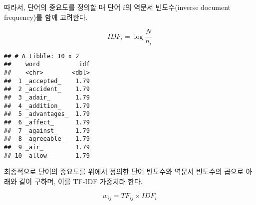 \documentclass[]{book}
\newenvironment{Shaded}{\begin{snugshade}}{\end{snugshade}}
\newcommand{\DataTypeTok}[1]{\textcolor[rgb]{0.13,0.29,0.53}{#1}}
\newcommand{\DecValTok}[1]{\textcolor[rgb]{0.00,0.00,0.81}{#1}}
\newcommand{\KeywordTok}[1]{\textcolor[rgb]{0.13,0.29,0.53}{\textbf{#1}}}
\newcommand{\NormalTok}[1]{#1}
\newcommand{\OperatorTok}[1]{\textcolor[rgb]{0.81,0.36,0.00}{\textbf{#1}}}
\newcommand{\StringTok}[1]{\textcolor[rgb]{0.31,0.60,0.02}{#1}}
\begin{document}
따라서, 단어의 중요도를 정의할 때 단어 \(i\)의 역문서 빈도수(inverse document frequency)를 함께 고려한다.

\begin{equation*}
IDF_{i} = \log \frac{N}{n_i}
\end{equation*}

\begin{Shaded}
\end{Shaded}

\begin{Shaded}
\end{Shaded}

\begin{verbatim}
## # A tibble: 10 x 2
##    word           idf
##    <chr>        <dbl>
##  1 _accepted_    1.79
##  2 _accident_    1.79
##  3 _adair_       1.79
##  4 _addition_    1.79
##  5 _advantages_  1.79
##  6 _affect_      1.79
##  7 _against_     1.79
##  8 _agreeable_   1.79
##  9 _air_         1.79
## 10 _allow_       1.79
\end{verbatim}

최종적으로 단어의 중요도를 위에서 정의한 단어 빈도수와 역문서 빈도수의 곱으로 아래와 같이 구하며, 이를 TF-IDF 가중치라 한다.

\begin{equation*}
w_{ij} = TF_{ij} \times IDF_{i}
\end{equation*}

\begin{Shaded}
\end{Shaded}
\end{document}
